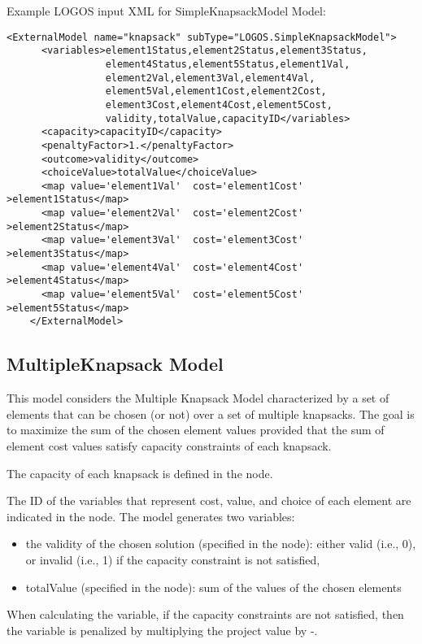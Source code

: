 Example LOGOS input XML for SimpleKnapsackModel Model:
\begin{lstlisting}[style=XML]
    <ExternalModel name="knapsack" subType="LOGOS.SimpleKnapsackModel">
      <variables>element1Status,element2Status,element3Status,
                 element4Status,element5Status,element1Val,
                 element2Val,element3Val,element4Val,
                 element5Val,element1Cost,element2Cost,
                 element3Cost,element4Cost,element5Cost,
                 validity,totalValue,capacityID</variables>
      <capacity>capacityID</capacity>
      <penaltyFactor>1.</penaltyFactor>
      <outcome>validity</outcome>
      <choiceValue>totalValue</choiceValue>
      <map value='element1Val'  cost='element1Cost' >element1Status</map>
      <map value='element2Val'  cost='element2Cost' >element2Status</map>
      <map value='element3Val'  cost='element3Cost' >element3Status</map>
      <map value='element4Val'  cost='element4Cost' >element4Status</map>
      <map value='element5Val'  cost='element5Cost' >element5Status</map>
    </ExternalModel>
\end{lstlisting}


\subsection{MultipleKnapsack Model}
\label{subsec:MultipleKnapsackModel}
This model considers the Multiple Knapsack Model characterized by a set of elements 
that can be chosen (or not) over a set of multiple knapsacks.
The goal is to maximize the sum of the chosen element values provided that the sum of 
element cost values satisfy capacity constraints of each knapsack.

The capacity of each knapsack is defined in the  node.

The ID of the variables that represent cost, value, and choice of each element are 
indicated in the  node.
The model generates two variables:
\begin{itemize}
  \item the validity of the chosen solution (specified in the  node): either 
        valid (i.e., 0), or invalid (i.e., 1) if the capacity constraint is not satisfied,
  \item totalValue (specified in the  node): sum of the values of the 
        chosen elements
\end{itemize}

When calculating the  variable, if the capacity constraints 
are not satisfied, then the  variable is penalized by multiplying the 
project value by -.

